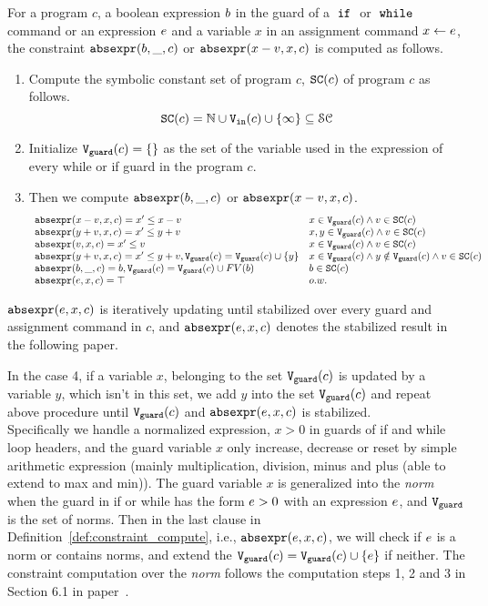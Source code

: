 \begin{defn}
  \label{def:constraint_compute}
  For a program $c$, a boolean expression $b$ in the guard of a $\;\mathtt{if}\;$ or $\;\mathtt{while}\;$ command
  or an expression $e$ and a variable $x$
  in an assignment command $\mathrel{ x \leftarrow e }$,
  the constraint $\mathtt{abs}{\mathtt{expr}}(b, \_, c )$ or $\mathtt{abs}{\mathtt{expr}}(x - v, x, c)$ is computed as follows.
  \begin{enumerate}
  \item Compute the symbolic constant set of program $c$, $\mathtt{SC}(c)$ of program $c$ as follows.
  \[
    \mathtt{SC}(c) = \mathbb{N} \cup {\ensuremath{\mathtt{V_{\mathtt{in}}}}}(c) \cup \{\infty \} \subseteq \mathcal{SC}
  \]
  \item Initialize 
  $\mathtt{V}_{\mathtt{guard}}(c) = \{\}$ as the set of the variable used in the expression of every while or if guard in the program $c$.
  \item Then we compute  $\mathtt{abs}{\mathtt{expr}}(b, \_, c )$ or $\mathtt{abs}{\mathtt{expr}}(x - v, x, c)$.
  \[
    \begin{array}{ll} 
      \mathtt{abs}{\mathtt{expr}}(x - v, x, c)  = x' \leq x - v  & x \in \mathtt{V}_{\mathtt{guard}}(c)\land v \in \mathtt{SC}(c) \\
      \mathtt{abs}{\mathtt{expr}}(y + v, x, c)  = x' \leq y + v  & x, y \in \mathtt{V}_{\mathtt{guard}}(c)\land v \in \mathtt{SC}(c)\\
      \mathtt{abs}{\mathtt{expr}}(v, x, c)  = x' \leq v  & x \in \mathtt{V}_{\mathtt{guard}}(c)\land v \in \mathtt{SC}(c) \\
      \mathtt{abs}{\mathtt{expr}}(y + v, x, c)  = x' \leq y + v, \mathtt{V}_{\mathtt{guard}}(c) = \mathtt{V}_{\mathtt{guard}}(c) \cup \{y\} 
      & x \in \mathtt{V}_{\mathtt{guard}}(c)\land y \notin \mathtt{V}_{\mathtt{guard}}(c) \land v \in \mathtt{SC}(c)  \\
      \mathtt{abs}{\mathtt{expr}}(b, \_, c) = b, \mathtt{V}_{\mathtt{guard}}(c) = \mathtt{V}_{\mathtt{guard}}(c) \cup FV(b) & b \in \mathtt{SC}(c) \\
      \mathtt{abs}{\mathtt{expr}}(e, x, c) = \top &  {o.w.} \\
    \end{array}
    \]
  \end{enumerate}
   $\mathtt{abs}{\mathtt{expr}}(e, x, c)$ is iteratively updating until stabilized over every guard and assignment command in $c$, and $\mathtt{abs}{\mathtt{expr}}(e, x, c)$
   denotes the stabilized result in the following paper.
  \end{defn}
%
In the case 4, if a variable $x$, belonging to the set 
  $\mathtt{V}_{\mathtt{guard}}(c)$ is updated by a variable $y$, which isn't in this set, 
  we add $y$ into the set $\mathtt{V}_{\mathtt{guard}}(c)$ and repeat 
  above procedure  until $\mathtt{V}_{\mathtt{guard}}(c)$ and $\mathtt{abs}{\mathtt{expr}}(e, x, c)$ is stabilized. 
  \\
Specifically 
we handle a 
normalized expression, $x > 0$
in guards of if and while loop headers, and 
the guard variable $x$ only increase, decrease or reset by 
simple arithmetic expression (mainly multiplication, division, minus and plus (able to extend to max and min)). 
The guard variable $x$ is generalized into the \emph{norm} when the guard 
in if or while has the form $e > 0$ with an expression $e$, and $\mathtt{V}_{\mathtt{guard}}$ is the set of norms.
Then in the last clause in Definition~\ref{def:constraint_compute}, i.e., $\mathtt{abs}{\mathtt{expr}}(e, x, c)$,
we will check if $e$ is a norm or contains norms, and extend the $\mathtt{V}_{\mathtt{guard}}(c)= \mathtt{V}_{\mathtt{guard}}(c)\cup \{e\}$ if neither.
The constraint computation over the \emph{norm} follows the computation steps 1, 2 and 3 in Section 6.1 in paper~\cite{sinn2017complexity}. 
%
